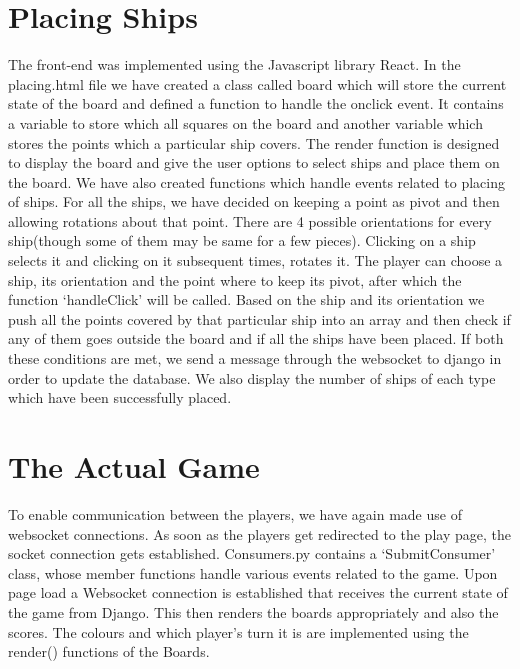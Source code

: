 \documentclass[titlepage]{article}
\begin{document}
\section{Placing Ships}
The front-end was implemented using the Javascript library React.
In the placing.html file we have created a class called board which will store the current state of the board and defined a function to handle the onclick event. It contains a variable to store which all squares on the board and another variable which stores the points which a particular ship covers. The render function is designed to display the board and give the user options to select ships and place them on the board. We have also created functions which handle events related to placing of ships. For all the ships, we have decided on keeping a point as pivot and then allowing rotations about that point. There are 4 possible orientations for every ship(though some of them may be same for a few pieces). Clicking on a ship selects it and clicking on it subsequent times, rotates it. The player can choose a ship, its orientation and the point where to keep its pivot, after which the function `handleClick' will be called. Based on the ship and its orientation we push all the points covered by that particular ship into an array and then check if any of them goes outside the board and if all the ships have been placed. If both these conditions are met, we send a message through the websocket to django in order to update the database. We also display the number of ships of each type which have been successfully placed.

\section{The Actual Game}
To enable communication between the players, we have again made use of websocket connections. As soon as the players get redirected to the play page, the socket connection gets established. Consumers.py contains a `SubmitConsumer' class, whose member functions handle various events related to the game. Upon page load a Websocket connection is established that receives the current state of the game from Django. This then renders the boards appropriately and also the scores. The colours and which player's turn it is are implemented using the render() functions of the Boards.
\end{document}

